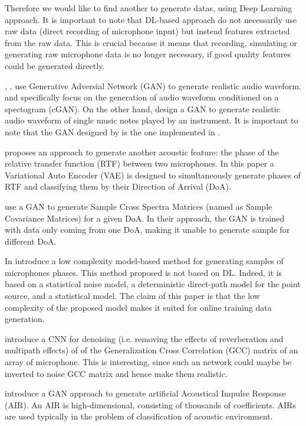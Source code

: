 \documentclass{article}
\begin{document}
Therefore we would like to find another to generate datas, using Deep Learning approach. It is important to note that DL-based approach do not necessarily use raw data (direct recording of microphone input) but instead features extracted from the raw data. This is crucial because it means that recording, simulating or generating raw microphone data is no longer necessary, if good quality features could be generated directly.

\cite{neekhara2019expediting}, \cite{NEURIPS2019_6804c9bc}, \cite{engel2019gansynth} use Generative Adversial Network (GAN) to generate realistic audio waveform. \cite{neekhara2019expediting} and \cite{NEURIPS2019_6804c9bc} specifically focus on the generation of audio waveform conditioned on a spectogram (cGAN). On the other hand, \cite{engel2019gansynth} design a GAN to generate realistic audio waveform of single music notes played by an instrument. It is important to note that the GAN designed by \cite{neekhara2019expediting} is the one implemented in \cite{vargas2021improved}. 

\cite{bianco2020semi} proposes an approach to generate another acoustic feature: the phase of the relative transfer function (RTF) between two microphones. In this paper a Variational Auto Encoder (VAE) is designed to simultaneously generate phases of RTF and classifying them by their Direction of Arrival (DoA).

\cite{gerstoft2020parametric} use a GAN to generate Sample Cross Spectra Matrices (named as Sample Covariance Matrices) for a given DoA. In their approach, the GAN is trained with data only coming from one DoA, making it unable to generate sample for different DoA.

In \cite{hubner2021efficient} introduce a low complexity model-based method for generating samples of microphones phases. This method proposed is not based on DL. Indeed, it is based on a statistical noise model, a deterministic direct-path model for the point source, and a statistical model. The claim of this paper is that the low complexity of the proposed  model makes it suited for online training data generation. 

\cite{vera2021acoustic} introduce a CNN for denoising (i.e. removing the effects of reverberation and multipath effects) of of the Generalization Cross Correlation (GCC) matrix of an array of microphone. This is interesting, since such an network could maybe be inverted to noise GCC matrix and hence make them realistic. 

\cite{papayiannis2019data} introduce a GAN approach to generate artificial Acoustical Impulse Response (AIR). An AIR is high-dimensional, consisting of thousands of coefficients. AIRs are used typically in the problem of classification of acoustic environment.






%

 
\end{document}
